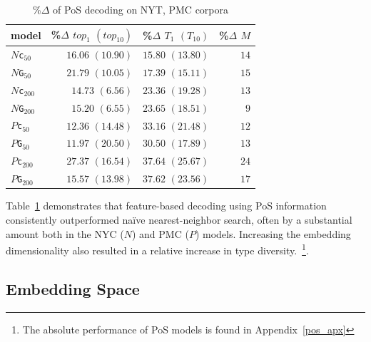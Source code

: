 \documentclass[11pt,a4paper]{article}
\begin{document}
\begin{table}[h]
\begin{center}
\begin{tabular}{lrrr}
model & \%$\Delta$ $top_{1}$ $(top_{10})$ & \%$\Delta$ $T_{1}$ $(T_{10})$ & \%$\Delta$ $M$ \\ \hline
$N${\tt c}$_{50}$ & $16.06$ $(10.90)$ & $15.80$ $(13.80)$&  $14$  \\
$N${\tt G}$_{50}$ & $21.79$ $(10.05)$ & $17.39$ $(15.11)$ & $15$   \\
$N${\tt c}$_{200}$ & $14.73$ $(6.56)$ & $23.36$ $(19.28)$ & $13$  \\
$N${\tt G}$_{200}$ & $15.20$ $(6.55)$ &  $23.65$ $(18.51)$ & $9$  \\
\addlinespace[1ex]
$P${\tt c}$_{50}$ & $12.36$ $(14.48)$  & $33.16$ $(21.48)$ & $12$ \\
$P${\tt G}$_{50}$ & $11.97$ $(20.50)$  & $30.50$ $(17.89)$  & $13$\\
$P${\tt c}$_{200}$ & $27.37$ $(16.54)$ & $37.64$ $(25.67)$ & $24$  \\
$P${\tt G}$_{200}$ & $15.57$ $(13.98)$  & $37.62$ $(23.56)$ & $17$\\
\end{tabular}
\end{center}
\vspace{-0.1in}
\caption{\label{pos} \%$\Delta$ of PoS decoding on NYT, PMC corpora}
\end{table}



Table~\ref{pos} demonstrates that feature-based decoding using PoS information consistently  outperformed naïve nearest-neighbor search, often by a substantial amount both in the NYC ($N$) and PMC ($P$) models. 
Increasing the embedding dimensionality also resulted in a relative increase in type diversity.~\footnote{The absolute performance of PoS models is found in Appendix~\ref{pos_apx}}.

\subsection{Embedding Space}\label{space}
\end{document}
